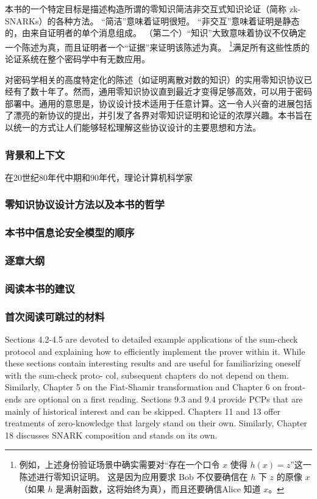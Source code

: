 本书的一个特定目标是描述构造所谓的零知识简洁非交互式知识论证（简称 zk-SNARKs）的各种方法。 “简洁”意味着证明很短。 “非交互”意味着证明是静态的，由来自证明者的单个消息组成。 （第二个）“知识”大致意味着协议不仅确定一个陈述为真，而且证明者一个“证据”来证明该陈述为真。 \footnote{例如，上述身份验证场景中确实需要对“存在一个口令 $x$ 使得 $h(x)=z$”这一陈述进行零知识证明。 这是因为应用要求 Bob 不仅要确信在 $h$ 下 $z$ 的原像 $x$（如果 $h$ 是满射函数，这将始终为真），而且还要确信Alice 知道 $x$。}满足所有这些性质的论证系统在整个密码学中有无数应用。

对密码学相关的高度特定化的陈述（如证明离散对数的知识\cite{Sch89}）的实用零知识协议已经有了数十年了。然而，通用零知识协议直到最近才变得足够高效，可以用于密码部署中。通用的意思是，协议设计技术适用于任意计算。这一令人兴奋的进展包括了漂亮的新协议的提出，并引发了各界对零知识证明和论证的浓厚兴趣。本书旨在以统一的方式让人们能够轻松理解这些协议设计的主要思想和方法。

\subsubsection{背景和上下文} 在20世纪80年代中期和90年代，理论计算机科学家
\subsubsection{零知识协议设计方法以及本书的哲学}  
\subsubsection{本书中信息论安全模型的顺序}
\subsubsection{逐章大纲}
\subsubsection{阅读本书的建议}



\subsubsection{首次阅读可跳过的材料} Sections 4.2-4.5 are devoted to detailed example applications of the sum-check protocol and explaining how to efficiently implement the prover within it. While these sections contain interesting results and are useful for familiarizing oneself with the sum-check proto- col, subsequent chapters do not depend on them. Similarly, Chapter 5 on the Fiat-Shamir transformation and Chapter 6 on front-ends are optional on a first reading. Sections 9.3 and 9.4 provide PCPs that are mainly of historical interest and can be skipped.
Chapters 11 and 13 offer treatments of zero-knowledge that largely stand on their own. Similarly, Chapter 18 discusses SNARK composition and stands on its own.



